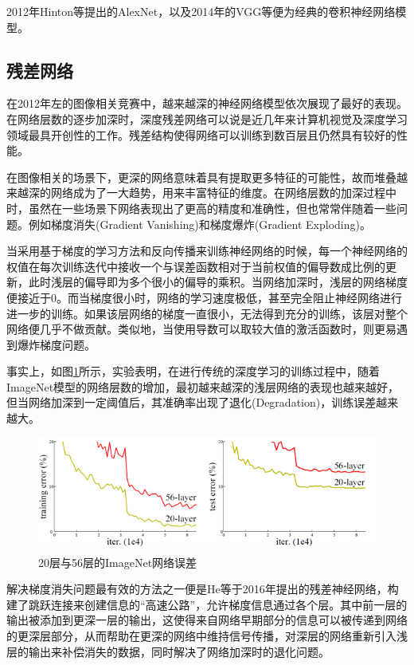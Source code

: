 2012年Hinton等提出的AlexNet，以及2014年的VGG等便为经典的卷积神经网络模型。



\subsection{残差网络}{}

在2012年左的图像相关竞赛中，越来越深的神经网络模型依次展现了最好的表现。在网络层数的逐步加深时，深度残差网络可以说是近几年来计算机视觉及深度学习领域最具开创性的工作。残差结构使得网络可以训练到数百层且仍然具有较好的性能。

在图像相关的场景下，更深的网络意味着具有提取更多特征的可能性，故而堆叠越来越深的网络成为了一大趋势，用来丰富特征的维度。在网络层数的加深过程中时，虽然在一些场景下网络表现出了更高的精度和准确性，但也常常伴随着一些问题。例如梯度消失(Gradient Vanishing)和梯度爆炸(Gradient Exploding)。

当采用基于梯度的学习方法和反向传播来训练神经网络的时候，每一个神经网络的权值在每次训练迭代中接收一个与误差函数相对于当前权值的偏导数成比例的更新，此时浅层的偏导即为多个很小的偏导的乘积。当网络加深时，浅层的网络梯度便接近于0。而当梯度很小时，网络的学习速度极低，甚至完全阻止神经网络进行进一步的训练。如果该层网络的梯度一直很小，无法得到充分的训练，该层对整个网络便几乎不做贡献。类似地，当使用导数可以取较大值的激活函数时，则更易遇到爆炸梯度问题。

事实上，如图\ref{fig:f9}所示，实验表明，在进行传统的深度学习的训练过程中，随着ImageNet模型的网络层数的增加，最初越来越深的浅层网络的表现也越来越好，但当网络加深到一定阈值后，其准确率出现了退化(Degradation)，训练误差越来越大。

\begin{figure}[h]
	\centering
	\includegraphics[scale=1]{figures/9.png}
	\caption{20层与56层的ImageNet网络误差\textsuperscript{\cite{p29}}}
	\label{fig:f9}
\end{figure}

解决梯度消失问题最有效的方法之一便是He等于2016年提出的残差神经网络，构建了跳跃连接来创建信息的“高速公路”，允许梯度信息通过各个层。其中前一层的输出被添加到更深一层的输出，这使得来自网络早期部分的信息可以被传递到网络的更深层部分，从而帮助在更深的网络中维持信号传播，对深层的网络重新引入浅层的输出来补偿消失的数据，同时解决了网络加深时的退化问题。

